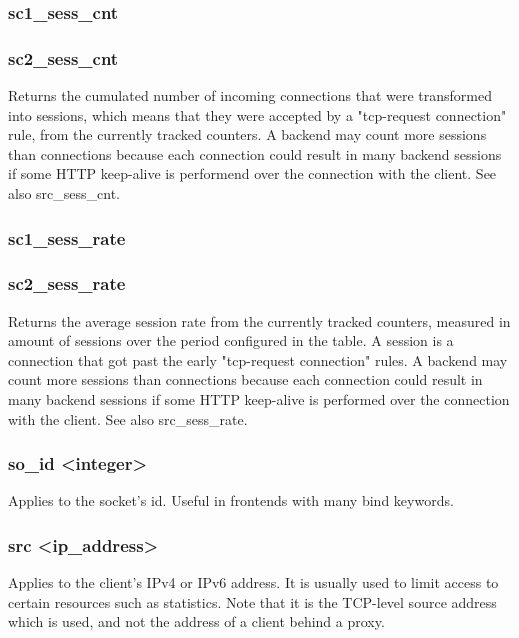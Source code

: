 \subsubsection[sc1\_sess\_cnt]{sc1\_sess\_cnt}
\subsubsection[sc2\_sess\_cnt]{sc2\_sess\_cnt}
  Returns the cumulated number of incoming connections that were transformed
  into sessions, which means that they were accepted by a "tcp-request
  connection" rule, from the currently tracked counters. A backend may count
  more sessions than connections because each connection could result in many
  backend sessions if some HTTP keep-alive is performend over the connection
  with the client. See also src\_sess\_cnt.

\subsubsection[sc1\_sess\_rate]{sc1\_sess\_rate}
\subsubsection[sc2\_sess\_rate]{sc2\_sess\_rate}
  Returns the average session rate from the currently tracked counters,
  measured in amount of sessions over the period configured in the table. A
  session is a connection that got past the early "tcp-request connection"
  rules. A backend may count more sessions than connections because each
  connection could result in many backend sessions if some HTTP keep-alive is
  performed over the connection with the client. See also src\_sess\_rate.

\subsubsection[so\_id]{so\_id <integer>}
  Applies to the socket's id. Useful in frontends with many bind keywords.

\subsubsection[src]{src <ip\_address>}
  Applies to the client's IPv4 or IPv6 address. It is usually used to limit
  access to certain resources such as statistics. Note that it is the TCP-level
  source address which is used, and not the address of a client behind a proxy.

